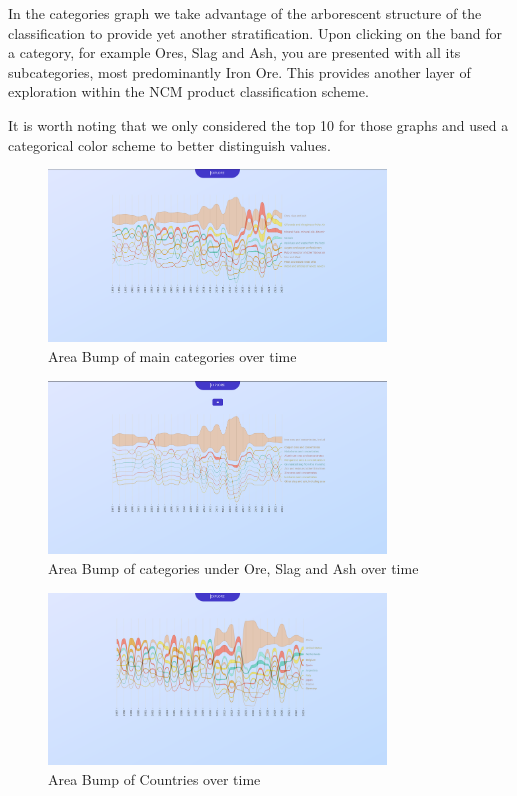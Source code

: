 \documentclass[12pt,a4]{article}
\begin{document}
In the categories graph we take advantage of the arborescent structure of the classification to provide yet another stratification. Upon clicking on the band for a category, for example Ores, Slag and Ash, you are presented with all its subcategories, most predominantly Iron Ore. This provides another layer of exploration within the NCM product classification scheme.

It is worth noting that we only considered the top 10 for those graphs and used a categorical color scheme to better distinguish values.

\begin{figure}[H]
    \centering
    \includegraphics[width=0.8\textwidth]{bump.png}
    \caption{Area Bump of main categories over time}
\end{figure}

\begin{figure}[H]
    \centering
    \includegraphics[width=0.8\textwidth]{bump2.png}
    \caption{Area Bump of categories under Ore, Slag and Ash over time}
\end{figure}

\begin{figure}[H]
    \centering
    \includegraphics[width=0.8\textwidth]{bump3.png}
    \caption{Area Bump of Countries over time}
\end{figure}
\end{document}
